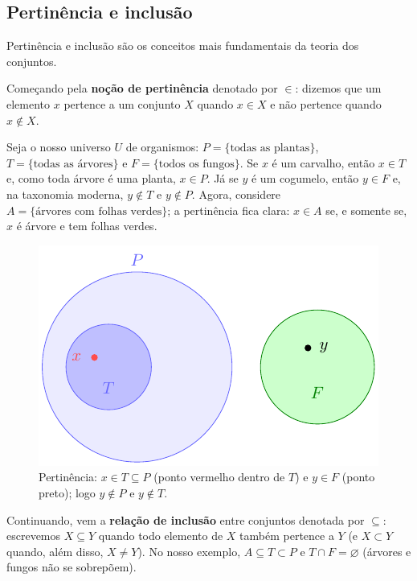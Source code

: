 \subsection{Pertinência e inclusão}


Pertinência e inclusão são os conceitos mais fundamentais da teoria dos conjuntos.


Começando pela \textbf{noção de pertinência} denotado por \(\in\): dizemos que um elemento \(x\) pertence a um conjunto \(X\) quando \(x \in X\) e não pertence quando \(x \notin X\).


Seja o nosso universo \(U\) de organismos: \(P=\{\text{todas as plantas}\}\), \(T=\{\text{todas as árvores}\}\) e \(F=\{\text{todos os fungos}\}\). Se \(x\) é um carvalho, então \(x\in T\) e, como toda árvore é uma planta, \(x\in P\). Já se \(y\) é um cogumelo, então \(y\in F\) e, na taxonomia moderna, \(y\notin T\) e \(y\notin P\). Agora, considere \(A=\{\text{árvores com folhas verdes}\}\); a pertinência fica clara: \(x\in A\) se, e somente se, \(x\) é árvore e tem folhas verdes.


\begin{figure}[H]
	\centering
	\includegraphics[width=0.9\linewidth]{figures/fig_pertinencia.pdf}

	\caption{Pertinência: $x\in T\subseteq P$ (ponto vermelho dentro de $T$) e $y\in F$ (ponto preto); logo $y\notin P$ e $y\notin T$.}
	\label{fig:pertinencia}\end{figure}



Continuando, vem a \textbf{relação de inclusão} entre conjuntos denotada por \(\subseteq\): escrevemos \(X \subseteq Y\) quando todo elemento de \(X\) também pertence a \(Y\) (e \(X\subset Y\) quando, além disso, \(X\neq Y\)). No nosso exemplo, \(A\subseteq T\subset P\) e \(T\cap F=\varnothing\) (árvores e fungos não se sobrepõem).


